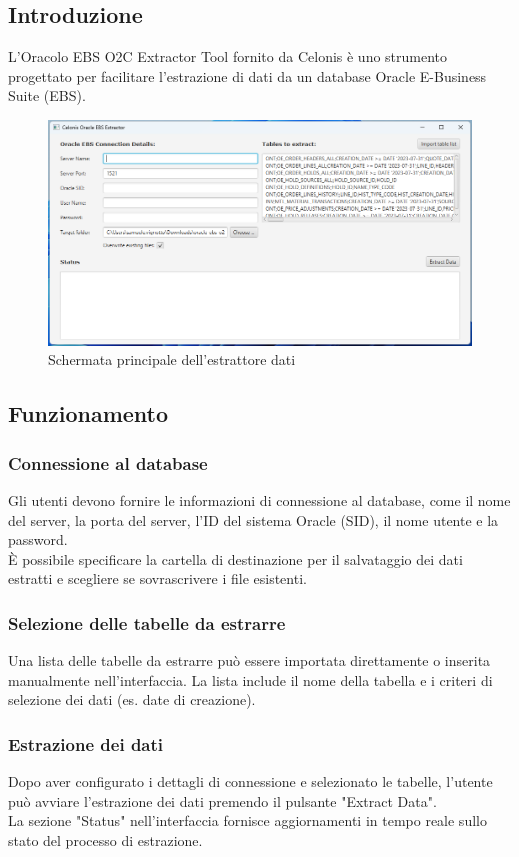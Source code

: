 \documentclass{article}
\begin{document}
\subsection{Introduzione}
L'Oracolo EBS O2C Extractor Tool fornito da Celonis è uno strumento progettato per facilitare l'estrazione di dati da un database Oracle E-Business Suite (EBS).
\begin{figure}[H]
    \centering
    \includegraphics[width=\textwidth]{imgCelonis/oracle-EBS-extractor.png}
    \caption{Schermata principale dell'estrattore dati}
    \label{fig:chermata-principale-extractor}
\end{figure}
\subsection{Funzionamento}
\subsubsection{Connessione al database}
Gli utenti devono fornire le informazioni di connessione al database, come il nome del server, la porta del server, l'ID del sistema Oracle (SID), il nome utente e la password.\\
È possibile specificare la cartella di destinazione per il salvataggio dei dati estratti e scegliere se sovrascrivere i file esistenti.
\subsubsection{Selezione delle tabelle da estrarre}
Una lista delle tabelle da estrarre può essere importata direttamente o inserita manualmente nell'interfaccia. La lista include il nome della tabella e i criteri di selezione dei dati (es. date di creazione).
\subsubsection{Estrazione dei dati}
Dopo aver configurato i dettagli di connessione e selezionato le tabelle, l'utente può avviare l'estrazione dei dati premendo il pulsante "Extract Data".\\
La sezione "Status" nell'interfaccia fornisce aggiornamenti in tempo reale sullo stato del processo di estrazione.
\end{document}
